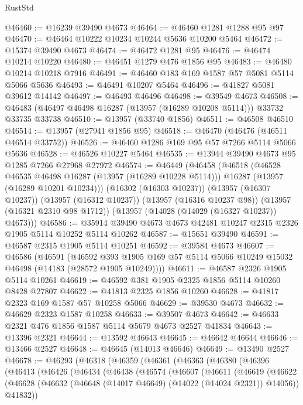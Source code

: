 \begin{lexlean}{RustStd}
\begin{coremodule}
@46460 := @16239 @39490 @4673
@46464 := @46460 @1281 @1288 @95 @97
@46470 := @46464 @10222 @10234 @10244 @5636 @10200 @5464
@46472 := @15374 @39490 @4673
@46474 := @46472 @1281 @95
@46476 := @46474 @10214 @10220
@46480 := @46451 @1279 @476 @1856 @95
@46483 := @46480 @10214 @10218 @7916
@46491 := @46460 @183 @169 @1587 @57 @5081 @5114 @5066 @5636
@46493 := @46491 @10207 @5464
@46496 := @41827 @5081 @39612 @14142
@46497 := @46493 @46496
@46498 := @39549 @4673
@46508 := @46483 (@46497 @46498 @16287 (@13957 (@16289 @10208 @5114))) @33732 @33735 @33738
@46510 := @13957 (@33740 @1856)
@46511 := @46508 @46510
@46514 := @13957 (@27941 @1856 @95)
@46518 := @46470 (@46476 (@46511 @46514 @33752))
@46526 := @46460 @1286 @169 @95 @57 @7266 @5114 @5066 @5636
@46528 := @46526 @10227 @5464
@46535 := @13944 @39490 @4673 @95 @1285 @7266 @27968 @27972
@46574 := @46449
    (@46458
      (@46518
        (@46528 @46535 @46498 @16287 (@13957 (@16289 @10228 @5114)))
        @16287
        (@13957 (@16289 @10201 @10234)))
      (@16302 (@16303 @10237))
      (@13957 (@16307 @10237))
      (@13957 (@16312 @10237))
      (@13957 (@16316 @10237 @98))
      (@13957 (@16321 @2310 @98 @1712))
      (@13957 (@14028 (@14029 (@16327 @10237)) @4673)))
@46586 := @35914 @39490 @4673 @4673 @42481 @10247 @2315 @2326 @1905 @5114 @10252 @5114 @10262
@46587 := @15651 @39490
@46591 := @46587 @2315 @1905 @5114 @10251
@46592 := @39584 @4673
@46607 := @46586
    (@46591
      (@46592 @393 @1905 @169 @57 @5114 @5066 @10249 @15032 @46498 (@14183 (@28572 @1905 @10249))))
@46611 := @46587 @2326 @1905 @5114 @10261
@46619 := @46592 @381 @1905 @2325 @1856 @5114 @10260 @8428 @27807
@46622 := @41813 @2325 @1856 @10260
@46628 := @41817 @2323 @169 @1587 @57 @10258 @5066
@46629 := @39530 @4673
@46632 := @46629 @2323 @1587 @10258
@46633 := @39507 @4673
@46642 := @46633 @2321 @476 @1856 @1587 @5114 @5679 @4673 @2527 @41834
@46643 := @13396 @2321
@46644 := @13592 @46643
@46645 := @46642 @46644
@46646 := @13466 @2527
@46648 := @46645 (@14013 @46646)
@46649 := @13490 @2527
@46678 := @46293
    (@46318
      (@46359
        (@46361
          (@46363
            (@46380
              (@46396
                (@46413
                  (@46426
                    (@46434
                      (@46438
                        (@46574
                          (@46607
                            (@46611
                              (@46619
                                (@46622
                                  (@46628
                                    (@46632 (@46648 (@14017 @46649) (@14022 (@14024 @2321)) @14056))
                                    @41832))

\end{coremodule}
\end{lexlean}
